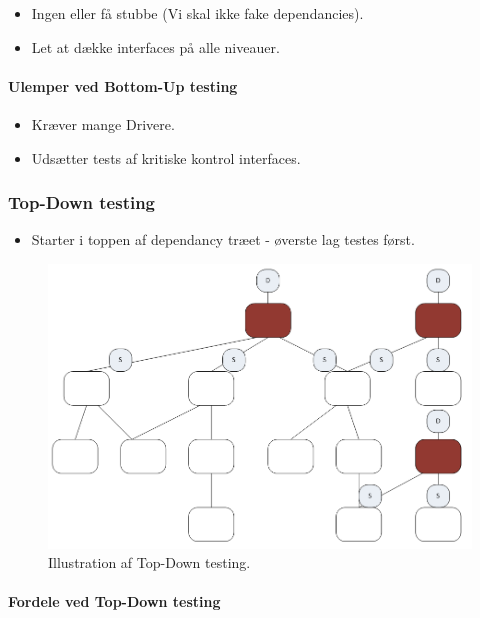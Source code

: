 \begin{itemize}
	\item Ingen eller få stubbe (Vi skal ikke fake dependancies).
	\item Let at dække interfaces på alle niveauer.
\end{itemize}

\paragraph{Ulemper ved Bottom-Up testing}

\begin{itemize}
	\item Kræver mange Drivere.
	\item Udsætter tests af kritiske kontrol interfaces.
\end{itemize}


\subsubsection{Top-Down testing}

\begin{itemize}
	\item Starter i toppen af dependancy træet - øverste lag testes først.
\end{itemize}

\begin{figure}
\centering
\includegraphics[width=0.7\linewidth]{figs/topDown.PNG}
\caption{Illustration af Top-Down testing.}
\label{fig:topDown}
\end{figure}

\paragraph{Fordele ved Top-Down testing}

